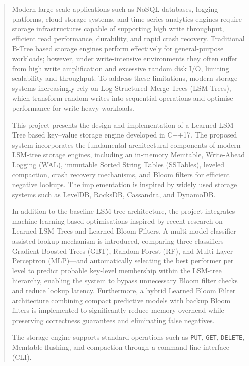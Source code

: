 \documentclass{mnitjaipur}
\begin{document}
	
	\frontpage
	\certificate
	\acknowledgment
 	\declaration
	
	\begin{abstract}

\noindent
Modern large-scale applications such as NoSQL databases, logging platforms, cloud storage systems, and time-series analytics engines require storage infrastructures capable of supporting high write throughput, efficient read performance, durability, and rapid crash recovery. Traditional B-Tree based storage engines perform effectively for general-purpose workloads; however, under write-intensive environments they often suffer from high write amplification and excessive random disk I/O, limiting scalability and throughput. To address these limitations, modern storage systems increasingly rely on Log-Structured Merge Trees (LSM-Trees), which transform random writes into sequential operations and optimise performance for write-heavy workloads.

This project presents the design and implementation of a Learned LSM-Tree based key--value storage engine developed in C++17. The proposed system incorporates the fundamental architectural components of modern LSM-tree storage engines, including an in-memory Memtable, Write-Ahead Logging (WAL), immutable Sorted String Tables (SSTables), leveled compaction, crash recovery mechanisms, and Bloom filters for efficient negative lookups. The implementation is inspired by widely used storage systems such as LevelDB, RocksDB, Cassandra, and DynamoDB.

In addition to the baseline LSM-tree architecture, the project integrates machine learning based optimisations inspired by recent research on Learned LSM-Trees and Learned Bloom Filters. A multi-model classifier-assisted lookup mechanism is introduced, comparing three classifiers---Gradient Boosted Trees (GBT), Random Forest (RF), and Multi-Layer Perceptron (MLP)---and automatically selecting the best performer per level to predict probable key-level membership within the LSM-tree hierarchy, enabling the system to bypass unnecessary Bloom filter checks and reduce lookup latency. Furthermore, a hybrid Learned Bloom Filter architecture combining compact predictive models with backup Bloom filters is implemented to significantly reduce memory overhead while preserving correctness guarantees and eliminating false negatives.

The storage engine supports standard operations such as \texttt{PUT}, \texttt{GET}, \texttt{DELETE}, Memtable flushing, and compaction through a command-line interface (CLI). 


\end{abstract}
\end{document}
